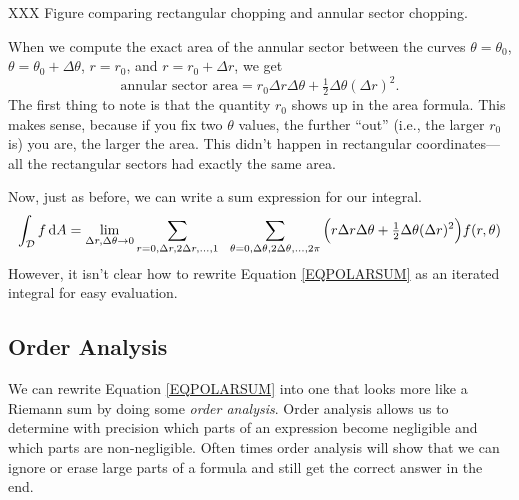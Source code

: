 XXX Figure comparing rectangular chopping and annular sector chopping.

When we compute the exact area of the annular sector between the curves
$\theta=\theta_0$, $\theta=\theta_0+\Delta\theta$, $r=r_0$, and $r=r_0+\Delta r$, 
we get 
\[
	\text{annular sector area} = r_0\Delta r\Delta \theta + \tfrac{1}{2}\Delta\theta(\Delta r)^2.
\]
The first thing to note is that the quantity $r_0$ shows up in the area formula.  
This makes sense, because if you fix two $\theta$ values, the further ``out'' (i.e., the larger
$r_0$ is) you are, the larger the area.  This didn't happen in rectangular coordinates---all the rectangular
sectors had exactly the same area.

Now, just as before, we can write a sum expression for our integral.
\begin{equation}
	\label{EQPOLARSUM}
	\int_{\mathcal D} f\,\d A =\lim_{\Delta r,\Delta \theta\to 0}
	\sum_{r=0,\Delta r,2\Delta r,\ldots,1}\ \ \sum_{\theta=0,\Delta\theta,
	2\Delta\theta, \ldots, 2\pi} \Big(
		r\Delta r\Delta \theta + \tfrac{1}{2}\Delta\theta(\Delta r)^2
	\Big)f(r,\theta)
\end{equation}
However, it isn't clear how to rewrite Equation \eqref{EQPOLARSUM} as an iterated integral
for easy evaluation.

\subsection{Order Analysis}
We can rewrite Equation \eqref{EQPOLARSUM} into one that looks more like a Riemann sum by
doing some \emph{order analysis}.  Order analysis allows us to determine
with precision
which parts of an expression become negligible and which parts are non-negligible.  Often
times order analysis will show that we can ignore or erase large parts of a formula and still
get the correct answer in the end.


